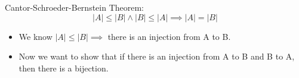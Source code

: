 \documentclass[letterpaper,12pt]{article}
\begin{document}
Cantor-Schroeder-Bernstein Theorem: \[|A|\le |B| \land |B|\le |A| \implies |A|=|B|\]
\begin{itemize}
    \item We know $|A|\le|B|\implies$ there is an injection from A to B.
    \item Now we want to show that if there is an injection from A to B and B to A, then there is a bijection. 
\end{itemize}
\end{document}
